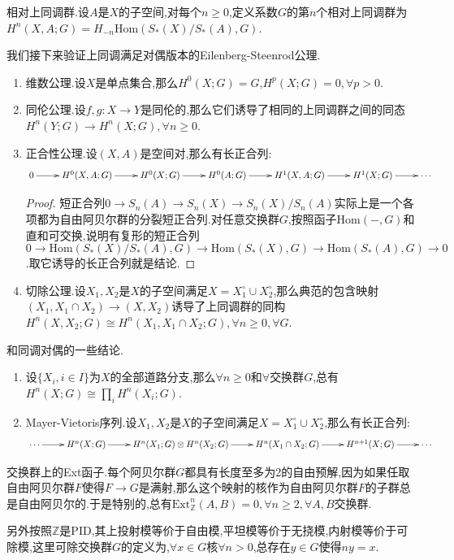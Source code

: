 相对上同调群.设$A$是$X$的子空间,对每个$n\ge0$,定义系数$G$的第$n$个相对上同调群为$H^n(X,A;G)=H_{-n}\mathrm{Hom}(S_*(X)/S_*(A),G)$.

我们接下来验证上同调满足对偶版本的Eilenberg-Steenrod公理.
\begin{enumerate}
	\item 维数公理.设$X$是单点集合,那么$H^0(X;G)=G$,$H^p(X;G)=0,\forall p>0$.
	\item 同伦公理.设$f,g:X\to Y$是同伦的,那么它们诱导了相同的上同调群之间的同态$H^n(Y;G)\to H^n(X;G),\forall n\ge0$.
	\item 正合性公理.设$(X,A)$是空间对,那么有长正合列:
	$$\xymatrix{0\ar[r]&H^0(X,A;G)\ar[r]&H^0(X;G)\ar[r]&H^0(A;G)\ar[r]&H^1(X,A;G)\ar[r]&H^1(X;G)\ar[r]&\cdots}$$
	\begin{proof}
		
		短正合列$0\to S_n(A)\to S_n(X)\to S_n(X)/S_n(A)$实际上是一个各项都为自由阿贝尔群的分裂短正合列.对任意交换群$G$,按照函子$\mathrm{Hom}(-,G)$和直和可交换,说明有复形的短正合列$0\to\mathrm{Hom}(S_*(X)/S_*(A),G)\to\mathrm{Hom}(S_*(X),G)\to\mathrm{Hom}(S_*(A),G)\to0$.取它诱导的长正合列就是结论.
	\end{proof}
    \item 切除公理.设$X_1,X_2$是$X$的子空间满足$X=X_1^{\circ}\cup X_2^{\circ}$,那么典范的包含映射$(X_1,X_1\cap X_2)\to(X,X_2)$诱导了上同调群的同构$H^n(X,X_2;G)\cong H^n(X_1,X_1\cap X_2;G),\forall n\ge0,\forall G$.
\end{enumerate}

和同调对偶的一些结论.
\begin{enumerate}
	\item 设$\{X_i,i\in I\}$为$X$的全部道路分支,那么$\forall n\ge0$和$\forall$交换群$G$,总有$H^n(X;G)\cong\prod_iH^n(X_i;G)$.
	\item Mayer-Vietoris序列.设$X_1,X_2$是$X$的子空间满足$X=X_1^{\circ}\cup X_2^{\circ}$,那么有长正合列:
	$$\xymatrix{\cdots\ar[r]&H^n(X;G)\ar[r]&H^n(X_1;G)\otimes H^n(X_2;G)\ar[r]&H^n(X_1\cap X_2;G)\ar[r]&H^{n+1}(X;G)\ar[r]&\cdots}$$
\end{enumerate}

交换群上的Ext函子.每个阿贝尔群$G$都具有长度至多为2的自由预解,因为如果任取自由阿贝尔群$F$使得$F\to G$是满射,那么这个映射的核作为自由阿贝尔群$F$的子群总是自由阿贝尔的.于是特别的,总有$\mathrm{Ext}^n_{\mathbb{Z}}(A,B)=0,\forall n\ge2,\forall A,B$交换群.

另外按照$\mathbb{Z}$是PID,其上投射模等价于自由模,平坦模等价于无挠模,内射模等价于可除模,这里可除交换群$G$的定义为,$\forall x\in G$核$\forall n>0$,总存在$y\in G$使得$ny=x$.













